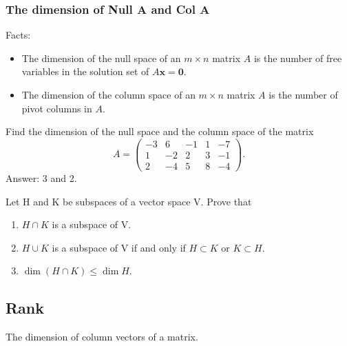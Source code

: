 \documentclass[10pt, a4paper]{article}
\newcommand{\vt}[1]{\mathbf{#1}}
\begin{document}
\subsubsection*{The dimension of Null A and Col A}
Facts:
\begin{itemize}
    \item The dimension of the null space of an $m\times n$ matrix $A$ is the number of free variables in the solution set of $A\vt{x}=\vt{0}$.
    \item The dimension of the column space of an $m\times n$ matrix $A$ is the number of pivot columns in $A$.
\end{itemize}
\begin{example}
    Find the dimension of the null space and the column space of the matrix \[
    A = \begin{pmatrix}
        -3 & 6 & -1 & 1 & -7\\
        1 & -2 & 2 & 3 & -1\\
        2 & -4 & 5 & 8 & -4
    \end{pmatrix}.
    \]
    Answer: 3 and 2.
\end{example}

\begin{example}
    Let H and K be subspaces of a vector space V. Prove that 
    \begin{enumerate}
        \item $H\cap K$ is a subspace of V.
        \item $H\cup K$ is a subspace of V if and only if $H\subset K$ or $K\subset H$.
        \item $\dim(H \cap K)\leq \dim H$.
    \end{enumerate}
\end{example}

\subsection{Rank}
The dimension of column vectors of a matrix.
\end{document}
